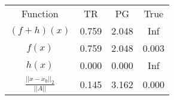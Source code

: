 \begin{tabular}{| c |c |c |c |}
    \hline
    \rowcolor[gray]{0.9}
\multicolumn{4}{|c|}{Minima} \\ \hline Function & TR & PG & True \\
    \hline
  \rowcolor[gray]{0.7}
    $ (f + h)(x) $ & 0.759 & 2.048 & Inf \\
  \hline
  \rowcolor[gray]{0.8}
    $ f(x) $ & 0.759 & 2.048 & 0.003 \\
  \hline
  \rowcolor[gray]{0.7}
    $ h(x) $ & 0.000 & 0.000 & Inf \\
  \hline
  \rowcolor[gray]{0.8}
    $ \frac{||x - x_0||_2}{||A||} $ & 0.145 & 3.162 & 0.000 \\
  \hline
\end{tabular}
